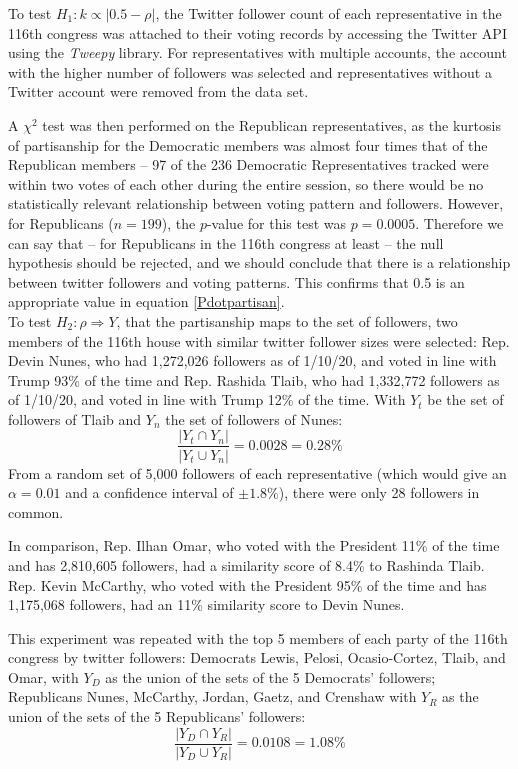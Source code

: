 \documentclass[preprint,review,12pt]{elsarticle}
\begin{document}
To test $H_1: k \propto |0.5 - \rho|$, the Twitter follower count of each representative in the 116th congress was attached to their voting records by accessing the Twitter API using the \textit{Tweepy} library. For representatives with multiple accounts, the account with the higher number of followers was selected and representatives without a Twitter account were removed from the data set. 

A $\chi^2$ test was then performed on the Republican representatives, as the kurtosis of partisanship for the Democratic members was almost four times that of the Republican members -- 97 of the 236 Democratic Representatives tracked were within two votes of each other during the entire session, so there would be no statistically relevant relationship between voting pattern and followers. However, for Republicans ($n = 199$), the $p$-value for this test was $p=0.0005$. Therefore we can say that -- for Republicans in the 116th congress at least -- the null hypothesis should be rejected, and we should conclude that there is a relationship between twitter followers and voting patterns. This confirms that 0.5 is an appropriate value in equation \ref{Pdotpartisan}.\\


To test $H_2: \rho \Rightarrow Y$, that the partisanship maps to the set of followers, two members of the 116th house with similar twitter follower sizes were selected: Rep. Devin Nunes, who had 1,272,026 followers as of 1/10/20, and voted in line with Trump 93\% of the time and Rep. Rashida Tlaib, who had 1,332,772 followers as of 1/10/20, and voted in line with Trump 12\% of the time. With $Y_t$ be the set of followers of Tlaib and $Y_n$ the set of followers of Nunes: 
\begin{equation}
\frac{|Y_t \cap Y_n|}{|Y_t \cup Y_n|} = 0.0028 = 0.28\%
\end{equation}
From a random set of 5,000 followers of each representative (which would give an $\alpha = 0.01$ and a confidence interval of $\pm 1.8\%$), there were only 28 followers in common.

In comparison, Rep. Ilhan Omar, who voted with the President 11\% of the time and has 2,810,605 followers, had a similarity score of 8.4\% to Rashinda Tlaib. Rep. Kevin McCarthy, who voted with the President 95\% of the time and has 1,175,068 followers, had an 11\% similarity score to Devin Nunes.

This experiment was repeated with the top 5 members of each party of the 116th congress by twitter followers: Democrats Lewis, Pelosi, Ocasio-Cortez, Tlaib, and Omar, with $Y_D$ as the union of the sets of the 5 Democrats' followers; Republicans Nunes, McCarthy, Jordan, Gaetz, and Crenshaw with $Y_R$ as the union of the sets of the 5 Republicans' followers:
\begin{equation}
\label{party overlap twitter}
    \frac{|Y_D \cap Y_R|}{|Y_D \cup Y_R|} = 0.0108 = 1.08\%
\end{equation}
\end{document}
